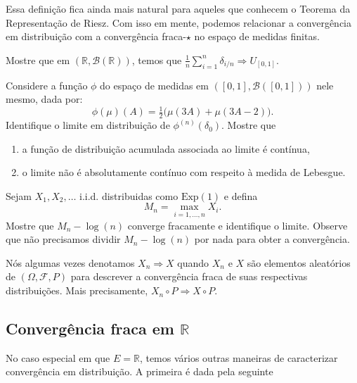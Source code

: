 Essa definição fica ainda mais natural para aqueles que conhecem o Teorema da Representação de Riesz.
Com isso em mente, podemos relacionar a convergência em distribuição com a convergência fraca-$\star$ no espaço de medidas finitas.

\begin{exercise}
  Mostre que em $(\mathbb{R}, \mathcal{B}(\mathbb{R}))$, temos que $\tfrac{1}{n} \sum_{i=1}^n \delta_{i/n} \Rightarrow U_{[0,1]}$.
\end{exercise}

\begin{exercise}
  Considere a função $\phi$ do espaço de medidas em $([0,1], \mathcal{B}([0,1]))$ nele mesmo, dada por:
  \begin{equation}
    \phi(\mu)(A) = \tfrac{1}{2} \big( \mu(3A) + \mu(3A - 2) \big).
  \end{equation}
  Identifique o limite em distribuição de $\phi^{(n)}(\delta_0)$.
  Mostre que
  \begin{enumerate}[\quad a)]
  \item a função de distribuição acumulada associada ao limite é contínua,
  \item o limite não é absolutamente contínuo com respeito à medida de Lebesgue.
  \end{enumerate}
\end{exercise}

\begin{exercise}
  Sejam $X_1, X_2, \dots$ i.i.d. distribuidas como $\text{Exp}(1)$ e defina
  \begin{equation}
    M_n = \max_{i = 1, \dots, n} X_i.
  \end{equation}
  Mostre que $M_n - \log(n)$ converge fracamente e identifique o limite.
  Observe que não precisamos dividir $M_n - \log(n)$ por nada para obter a convergência.
\end{exercise}

Nós algumas vezes denotamos $X_n \Rightarrow X$ quando $X_n$ e $X$ são elementos aleatórios de $(\Omega, \mathcal{F}, P)$ para descrever a convergência fraca de suas respectivas distribuições.
Mais precisamente, $X_n \circ P \Rightarrow X \circ P$.

\subsection{Convergência fraca em \texorpdfstring{$\mathbb{R}$}{R}}

No caso especial em que $E = \mathbb{R}$, temos vários outras maneiras de caracterizar convergência em distribuição.
A primeira é dada pela seguinte

